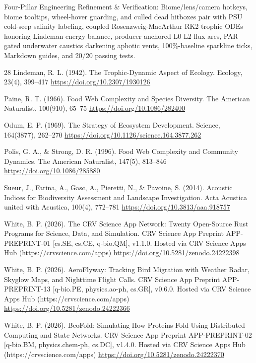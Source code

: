 \documentclass[10pt,letterpaper]{article}
\begin{document}
Four-Pillar Engineering Refinement \& Verification: Biome/lens/camera hotkeys, biome tooltips, wheel-hover guarding, and culled dead hitboxes pair with PSU cold-seep salinity labeling, coupled Rosenzweig-MacArthur RK2 trophic ODEs honoring Lindeman energy balance, producer-anchored L0-L2 flux arcs, PAR-gated underwater caustics darkening aphotic vents, 100\%-baseline sparkline ticks, Markdown guides, and 20/20 passing tests.

\begin{thebibliography}{28}
 Lindeman, R. L. (1942). The Trophic-Dynamic Aspect of Ecology. Ecology, 23(4), 399--417 \url{https://doi.org/10.2307/1930126}

 Paine, R. T. (1966). Food Web Complexity and Species Diversity. The American Naturalist, 100(910), 65--75 \url{https://doi.org/10.1086/282400}

 Odum, E. P. (1969). The Strategy of Ecosystem Development. Science, 164(3877), 262--270 \url{https://doi.org/10.1126/science.164.3877.262}

 Polis, G. A., \& Strong, D. R. (1996). Food Web Complexity and Community Dynamics. The American Naturalist, 147(5), 813--846 \url{https://doi.org/10.1086/285880}

 Sueur, J., Farina, A., Gasc, A., Pieretti, N., \& Pavoine, S. (2014). Acoustic Indices for Biodiversity Assessment and Landscape Investigation. Acta Acustica united with Acustica, 100(4), 772--781 \url{https://doi.org/10.3813/aaa.918757}

 White, B. P. (2026). The CRV Science App Network: Twenty Open-Source Rust Programs for Science, Data, and Simulation. CRV Science App Preprint APP-PREPRINT-01 [cs.SE, cs.CE, q-bio.QM], v1.1.0. Hosted via CRV Science Apps Hub (https://crvscience.com/apps) \url{https://doi.org/10.5281/zenodo.24222398}

 White, B. P. (2026). AeroFlyway: Tracking Bird Migration with Weather Radar, Skyglow Maps, and Nighttime Flight Calls. CRV Science App Preprint APP-PREPRINT-13 [q-bio.PE, physics.ao-ph, cs.GR], v0.6.0. Hosted via CRV Science Apps Hub (https://crvscience.com/apps) \url{https://doi.org/10.5281/zenodo.24222366}

 White, B. P. (2026). BeoFold: Simulating How Proteins Fold Using Distributed Computing and State Networks. CRV Science App Preprint APP-PREPRINT-02 [q-bio.BM, physics.chem-ph, cs.DC], v1.4.0. Hosted via CRV Science Apps Hub (https://crvscience.com/apps) \url{https://doi.org/10.5281/zenodo.24222370}


\end{thebibliography}
\end{document}
